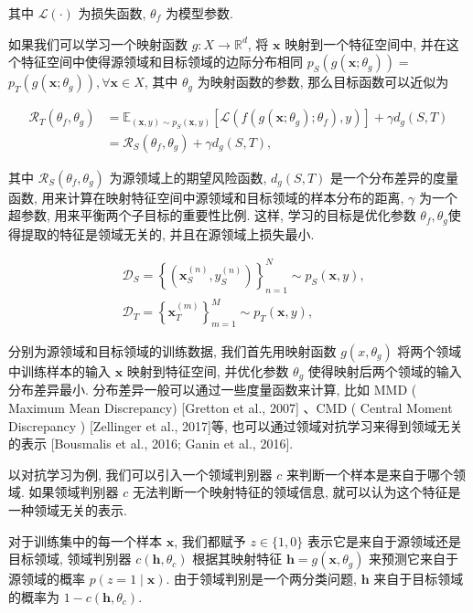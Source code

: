 \documentclass[10pt]{article}
\begin{document}
其中 $\mathcal{L}(\cdot)$ 为损失函数, $\theta_{f}$ 为模型参数.

如果我们可以学习一个映射函数 $g: X \rightarrow \mathbb{R}^{d}$, 将 $\boldsymbol{x}$ 映射到一个特征空间中, 并在这个特征空间中使得源领域和目标领域的边际分布相同 $p_{S}\left(g\left(\boldsymbol{x} ; \theta_{g}\right)\right)=$ $p_{T}\left(g\left(\boldsymbol{x} ; \theta_{g}\right)\right), \forall \boldsymbol{x} \in X$, 其中 $\theta_{g}$ 为映射函数的参数, 那么目标函数可以近似为


\begin{align*}
\mathcal{R}_{T}\left(\theta_{f}, \theta_{g}\right) & =\mathbb{E}_{(\boldsymbol{x}, y) \sim p_{S}(\boldsymbol{x}, y)}\left[\mathcal{L}\left(f\left(g\left(\boldsymbol{x} ; \theta_{g}\right) ; \theta_{f}\right), y\right)\right]+\gamma d_{g}(S, T)  \tag{10.29}\\
& =\mathcal{R}_{S}\left(\theta_{f}, \theta_{g}\right)+\gamma d_{g}(S, T), \tag{10.30}
\end{align*}


其中 $\mathcal{R}_{S}\left(\theta_{f}, \theta_{g}\right)$ 为源领域上的期望风险函数, $d_{g}(S, T)$ 是一个分布差异的度量函数, 用来计算在映射特征空间中源领域和目标领域的样本分布的距离, $\gamma$ 为一个超参数, 用来平衡两个子目标的重要性比例. 这样, 学习的目标是优化参数 $\theta_{f}, \theta_{g}$使得提取的特征是领域无关的, 并且在源领域上损失最小.


\begin{align*}
& \mathcal{D}_{S}=\left\{\left(\boldsymbol{x}_{S}^{(n)}, y_{S}^{(n)}\right)\right\}_{n=1}^{N} \sim p_{S}(\boldsymbol{x}, y),  \tag{10.31}\\
& \mathcal{D}_{T}=\left\{\boldsymbol{x}_{T}^{(m)}\right\}_{m=1}^{M} \sim p_{T}(\boldsymbol{x}, y), \tag{10.32}
\end{align*}


分别为源领域和目标领域的训练数据, 我们首先用映射函数 $g\left(x, \theta_{g}\right)$ 将两个领域中训练样本的输入 $\boldsymbol{x}$ 映射到特征空间, 并优化参数 $\theta_{g}$ 使得映射后两个领域的输入分布差异最小. 分布差异一般可以通过一些度量函数来计算, 比如 MMD ( Maximum Mean Discrepancy) [Gretton et al., 2007] 、CMD ( Central Moment Discrepancy ) [Zellinger et al., 2017]等, 也可以通过领域对抗学习来得到领域无关的表示 [Bousmalis et al., 2016; Ganin et al., 2016].

以对抗学习为例, 我们可以引入一个领域判别器 $c$ 来判断一个样本是来自于哪个领域. 如果领域判别器 $c$ 无法判断一个映射特征的领域信息, 就可以认为这个特征是一种领域无关的表示.

对于训练集中的每一个样本 $\boldsymbol{x}$, 我们都赋予 $z \in\{1,0\}$ 表示它是来自于源领域还是目标领域, 领域判别器 $c\left(\boldsymbol{h}, \theta_{c}\right)$ 根据其映射特征 $\boldsymbol{h}=g\left(\boldsymbol{x}, \theta_{g}\right)$ 来预测它来自于源领域的概率 $p(z=1 \mid \boldsymbol{x})$. 由于领域判别是一个两分类问题, $\boldsymbol{h}$ 来自于目标领域的概率为 $1-c\left(\boldsymbol{h}, \theta_{c}\right)$.
\end{document}
